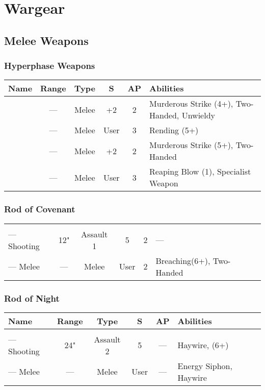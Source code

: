 \section{Wargear}

\subsection{Melee Weapons} \label{Melee Weapons}

\subsubsection{Hyperphase Weapons} 

\label{Hyperphase Sword} \label{Hyperphase Thresher} \label{Hyperphase Reap-Blade} \label{Hyperphase Harvester}
\noindent
\begin{NiceTabular}{m{130 pt} *{4}{c} >{\raggedright\arraybackslash}p{240pt}}
	Name & Range & Type & S & AP & Abilities \\
	\hline
	 & — & Melee & +2 & 2 & Murderous Strike (4+), Two-Handed, Unwieldy \\
	  & — & Melee & User & 3 & Rending (5+) \\
	 & — & Melee & +2 & 2 & Murderous Strike (5+), Two-Handed \\
	  & — & Melee & User & 3 & Reaping Blow (1), Specialist Weapon \\
\end{NiceTabular}

\subsubsection{Rod of Covenant} \label{Rod of Covenant}

\noindent
\begin{NiceTabular}{m{130 pt} *{4}{c} >{\raggedright\arraybackslash}p{240pt}}
	 &  &  &  &  & \\
	— Shooting & 12" & Assault 1 & 5 & 2 & — \\
	— Melee & — & Melee & User & 2 & Breaching(6+), Two-Handed \\
\end{NiceTabular}

\subsubsection{Rod of Night} \label{Rod of Night}
\noindent
\begin{NiceTabular}{m{130 pt} *{4}{c} >{\raggedright\arraybackslash}p{240pt}}
	Name & Range & Type & S & AP & Abilities \\
	\hline
	 &  &  &  &  & \\
	— Shooting & 24" & Assault 2 & 5 & — & Haywire,  (6+) \\
	— Melee & — & Melee & User & — & Energy Siphon, Haywire \\
\end{NiceTabular}

